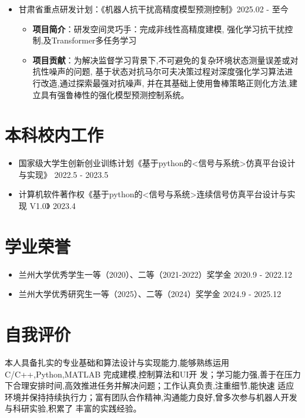 \documentclass{logo-cv}
\begin{document}
\begin{itemize}
    \begin{itemize}
        \item \textbf{项目简介}：应对在复杂情况下机器人的运动学控制,完成应用模仿学习、逆强化学习以及模型控制算法的机器人控制平台设计。
        \item \textbf{项目贡献}：设计手持控制器,结合嵌入式软件,保障便捷操作。基于QT开发上位机软件,实现友好界面与高效数据处理。针
                                对履带车底盘,优化机械设计与控制算法。探索机械臂与机械手运动学,开发精准控制策略。
                                利 用LeapMotion实现手势识别。集成多传感器技术,提升环境感知与定位。
    \end{itemize}
    \item 甘肃省重点研发计划：《机器人抗干扰高精度模型预测控制》\hfill 2025.02 - 至今 \begin{itemize}
        \item \textbf{项目简介}：研发空间灵巧手：完成非线性高精度建模, 强化学习抗干扰控制,及Transformer多任务学习
        \item \textbf{项目贡献}：为解决监督学习背景下,不可避免的复杂环境状态测量误差或对抗性噪声的问题,
        基于状态对抗马尔可夫决策过程对深度强化学习算法进行改造,通过探索最强对抗噪声,
        并在其基础上使用鲁棒策略正则化方法,建立具有强鲁棒性的强化模型预测控制系统。
    \end{itemize}
\end{itemize}


\section{本科校内工作}
\begin{itemize}
    \item 国家级大学生创新创业训练计划《基于python的<信号与系统>仿真平台设计与实现》 \hfill 2022.5 - 2023.5
    \item 计算机软件著作权《基于python的<信号与系统>连续信号仿真平台设计与实现 V1.0》 \hfill 2023.4
\end{itemize}

\section{学业荣誉}
\begin{itemize}
    \item 兰州大学优秀学生一等（2020）、二等（2021-2022）奖学金 \hfill 2020.9 - 2022.12
    \item 兰州大学优秀研究生一等（2025）、二等（2024）奖学金 \hfill 2024.9 - 2025.12
\end{itemize}

\section{自我评价}
本人具备扎实的专业基础和算法设计与实现能力,能够熟练运用C/C++,Python,MATLAB 完成建模,控制算法和UI开
发；学习能力强,善于在压力下合理安排时间,高效推进任务并解决问题；工作认真负责,注重细节,能快速
适应环境并保持持续执行力；富有团队合作精神,沟通能力良好,曾多次参与机器人开发与科研实验,积累了
丰富的实践经验。
\end{document}
